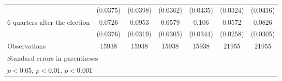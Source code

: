 \begin{table}[htbp]
\begin{tabular}{l*{6}{c}}
                    &    (0.0375)         &    (0.0398)         &    (0.0362)         &    (0.0435)         &    (0.0324)         &    (0.0416)         \\
[1em]
 6 quarters after the election&      0.0726         &      0.0953\sym{**} &      0.0579         &       0.106\sym{**} &      0.0572\sym{*}  &      0.0826\sym{**} \\
                    &    (0.0376)         &    (0.0319)         &    (0.0305)         &    (0.0344)         &    (0.0258)         &    (0.0305)         \\
\hline
Observations        &       15938         &       15938         &       15938         &       15938         &       21955         &       21955         \\
\hline\hline
\multicolumn{7}{l}{\footnotesize Standard errors in parentheses}\\
\multicolumn{7}{l}{\footnotesize \sym{*} \(p<0.05\), \sym{**} \(p<0.01\), \sym{***} \(p<0.001\)}\\
\end{tabular}
\end{table}
